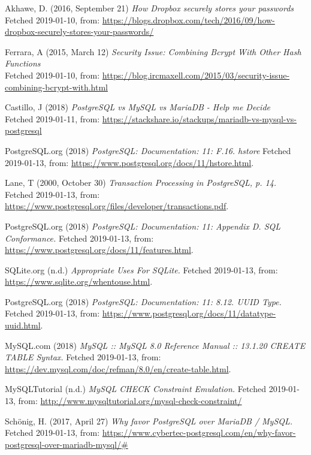 \documentclass[12pt,a4paper]{report}
\begin{document}
{\begin{thebibliography}{1}
Akhawe, D. (2016, September 21) {\em How Dropbox securely stores your passwords} \\
Fetched 2019-01-10, from:
\url{https://blogs.dropbox.com/tech/2016/09/how-dropbox-securely-stores-your-passwords/}

Ferrara, A (2015, March 12) {\em Security Issue: Combining Bcrypt With Other Hash Functions} \\
Fetched 2019-01-10, from:
\url{https://blog.ircmaxell.com/2015/03/security-issue-combining-bcrypt-with.html}

Castillo, J (2018) {\em PostgreSQL vs MySQL vs MariaDB - Help me Decide} \\
Fetched 2019-01-11, from:
\url{https://stackshare.io/stackups/mariadb-vs-mysql-vs-postgresql}

PostgreSQL.org (2018) {\em PostgreSQL: Documentation: 11: F.16. hstore} Fetched 2019-01-13, from: \url{https://www.postgresql.org/docs/11/hstore.html}.

Lane, T (2000, October 30) {\em Transaction Processing in PostgreSQL, p. 14.} Fetched 2019-01-13, from: \url{https://www.postgresql.org/files/developer/transactions.pdf}.

PostgreSQL.org (2018) {\em PostgreSQL: Documentation: 11: Appendix D. SQL Conformance.} Fetched 2019-01-13, from: \url{https://www.postgresql.org/docs/11/features.html}.

SQLite.org (n.d.) {\em Appropriate Uses For SQLite.} Fetched 2019-01-13, from: \url{https://www.sqlite.org/whentouse.html}.

PostgreSQL.org (2018) {\em PostgreSQL: Documentation: 11: 8.12. UUID Type.} Fetched 2019-01-13, from: \url{https://www.postgresql.org/docs/11/datatype-uuid.html}.

MySQL.com (2018) {\em MySQL :: MySQL 8.0 Reference Manual :: 13.1.20 CREATE TABLE Syntax.} Fetched 2019-01-13, from: \url{https://dev.mysql.com/doc/refman/8.0/en/create-table.html}.

MySQLTutorial (n.d.) {\em MySQL CHECK Constraint Emulation.} Fetched 2019-01-13, from: \url{http://www.mysqltutorial.org/mysql-check-constraint/}

Schönig, H. (2017, April 27) {\em Why favor PostgreSQL over MariaDB / MySQL.} Fetched 2019-01-13, from:  \url{https://www.cybertec-postgresql.com/en/why-favor-postgresql-over-mariadb-mysql/#}

\end{thebibliography}}
\end{document}
